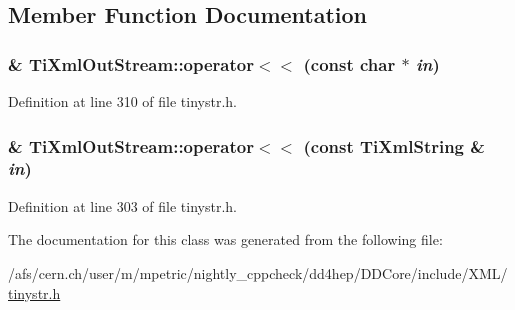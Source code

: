 \subsection{Member Function Documentation}
\hypertarget{class_ti_xml_out_stream_af2117e5a8cbfcb69544804ad2859bfb6}{
\subsubsection[{operator$<$$<$}]{\& TiXmlOutStream::operator$<$$<$ (const char $\ast$ {\em in})}}
\label{class_ti_xml_out_stream_af2117e5a8cbfcb69544804ad2859bfb6}


Definition at line 310 of file tinystr.h.\hypertarget{class_ti_xml_out_stream_a3640dcb1c0903be3bc6966cdc9a79db6}{
\subsubsection[{operator$<$$<$}]{\& TiXmlOutStream::operator$<$$<$ (const {\bf TiXmlString} \& {\em in})}}
\label{class_ti_xml_out_stream_a3640dcb1c0903be3bc6966cdc9a79db6}


Definition at line 303 of file tinystr.h.

The documentation for this class was generated from the following file:\begin{DoxyCompactItemize}
\item 
/afs/cern.ch/user/m/mpetric/nightly\_\-cppcheck/dd4hep/DDCore/include/XML/\hyperlink{tinystr_8h}{tinystr.h}\end{DoxyCompactItemize}
